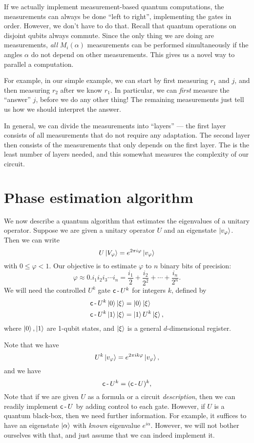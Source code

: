 If we actually implement measurement-based quantum computations, the measurements can always be done ``left to right'', implementing the gates in order. However, we don't have to do that. Recall that quantum operations on disjoint qubits always commute. Since the only thing we are doing are measurements, \emph{all} $M_i(\alpha)$ measurements can be performed simultaneously if the angles $\alpha$ do not depend on other measurements. This gives us a novel way to parallel a computation.

For example, in our simple example, we can start by first measuring $r_1$ and $j$, and then measuring $r_2$ after we know $r_1$. In particular, we can \emph{first} measure the ``answer'' $j$, before we do any other thing! The remaining measurements just tell us how we should interpret the answer.

In general, we can divide the measurements into ``layers'' --- the first layer consists of all measurements that do not require any adaptation. The second layer then consists of the measurements that only depends on the first layer. The  is the least number of layers needed, and this somewhat measures the complexity of our circuit.

\section{Phase estimation algorithm}
We now describe a quantum algorithm that estimates the eigenvalues of a unitary operator. Suppose we are given a unitary operator $U$ and an eigenstate $\left\lvert v_\varphi\right\rangle$. Then we can write
\[
  U \left\lvert V_\varphi\right\rangle = e^{2\pi i \varphi} \left\lvert v_\varphi\right\rangle
\]
with $0 \leq \varphi < 1$. Our objective is to estimate $\varphi$ to $n$ binary bits of precision:
\[
  \varphi \approx 0.i_1 i_2 i_3 \cdots i_n = \frac{i_1}{2} + \frac{i_2}{2^2} + \cdots + \frac{i_n}{2^n}.
\]
We will need the controlled $U^k$ gate $\mathsf{c}\operatorname{-} U^k$ for integers $k$, defined by
\begin{align*}
  \mathsf{c}\operatorname{-} U^k\left\lvert 0\right\rangle\left\lvert \xi\right\rangle &= \left\lvert 0\right\rangle\left\lvert \xi\right\rangle\\
  \mathsf{c}\operatorname{-} U^k\left\lvert 1\right\rangle\left\lvert \xi\right\rangle &= \left\lvert 1\right\rangle U^k\left\lvert \xi\right\rangle,
\end{align*}
where $\left\lvert 0\right\rangle, \left\lvert 1\right\rangle$ are 1-qubit states, and $\left\lvert \xi\right\rangle$ is a general $d$-dimensional register.

Note that we have
\[
  U^k \left\lvert v_\varphi\right\rangle = e^{2\pi i k \varphi}\left\lvert v_\varphi\right\rangle,
\]
and we have
\[
  \mathsf{c}\operatorname{-} U^k = (\mathsf{c}\operatorname{-} U)^k,
\]
Note that if we are given $U$ as a formula or a circuit \emph{description}, then we can readily implement $\mathsf{c}\operatorname{-} U$ by adding control to each gate. However, if $U$ is a quantum black-box, then we need further information. For example, it suffices to have an eigenstate $\left\lvert \alpha\right\rangle$ with \emph{known} eigenvalue $e^{i\alpha}$. However, we will not bother ourselves with that, and just assume that we can indeed implement it.

